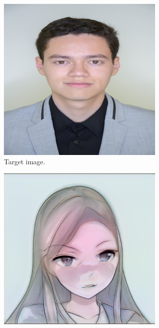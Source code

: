 \documentclass[conference]{IEEEtran}
\theoremstyle{definition}
\theoremstyle{remark}
\theoremstyle{remark}
\begin{document}
\begin{figure}
  \centering
  \begin{subfigure}[b]{0.15\textwidth}
    \centering \includegraphics[width=0.9\textwidth]{figs/anime-deipols-0.png}
    \caption{Target image.}
  \end{subfigure}
  \begin{subfigure}[b]{0.15\textwidth}
    \centering \includegraphics[width=0.9\textwidth]{figs/anime-deipols-1.png}

\end{subfigure}
\end{figure}
\end{document}
